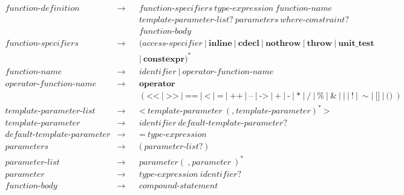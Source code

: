 \documentclass[a4paper,oneside,11pt]{article}
\begin{document}
\begin{align*}
function\textrm{-}definition &\rightarrow & &function\textrm{-}specifiers \> \hyperref[typeexpr]{type\textrm{-}expression} \> function\textrm{-}name\\
& & &template\textrm{-}parameter\textrm{-}list? \> parameters \> \hyperref[wherecontraint]{where\textrm{-}constraint}?\\
& & &function\textrm{-}body\\
function\textrm{-}specifiers &\rightarrow & &(\hyperref[accessspecifier]{access\textrm{-}specifier} \> | \> \textbf{inline} \> | \>
\textbf{cdecl} \> | \> \textbf{nothrow} \> | \> \textbf{throw} \> | \> \textbf{unit\_test} \>\\
& & &| \> \textbf{constexpr})^*\\
function\textrm{-}name &\rightarrow & &\hyperref[identifier]{identifier} \> | \> operator\textrm{-}function\textrm{-}name\\
operator\textrm{-}function\textrm{-}name &\rightarrow & &\textbf{operator}\\
& & &( \texttt{<<} \> | \> \texttt{>>} \> | \> \texttt{==} \> | \> \texttt{<} \> | \> \texttt{=} \> | \>
\texttt{++} \> | \> \texttt{--} \> | \> \texttt{->} \> | \> \texttt{+} \> | \> \texttt{-} \> | \> \texttt{*} \> | \> \texttt{/} \> | \> \texttt{\%} \> | \>
\texttt{\&} \> | \> \texttt{|} \> | \> \texttt{!} \> | \> \sim | \> \texttt{[]} \> | \> \texttt{()} \>)\\
template\textrm{-}parameter\textrm{-}list &\rightarrow & &\texttt{<} \> template\textrm{-}parameter \> (\texttt{,} \> template\textrm{-}parameter)^* \> \texttt{>}\\
template\textrm{-}parameter &\rightarrow & &\hyperref[identifier]{identifier} \> default\textrm{-}template\textrm{-}parameter?\\
default\textrm{-}template\textrm{-}parameter &\rightarrow & &\texttt{=} \> \hyperref[typeexpr]{type\textrm{-}expression}\\
parameters &\rightarrow & &\texttt{(} \> parameter\textrm{-}list? \> \texttt{)}\\
parameter\textrm{-}list &\rightarrow & &parameter (\> \texttt{,} \> parameter \> )^*\\
parameter &\rightarrow & &\hyperref[typeexpr]{type\textrm{-}expression} \> \hyperref[identifier]{identifier}?\\
function\textrm{-}body &\rightarrow & &\hyperref[compoundstatement]{compound\textrm{-}statement}
\end{align*}
\end{document}
